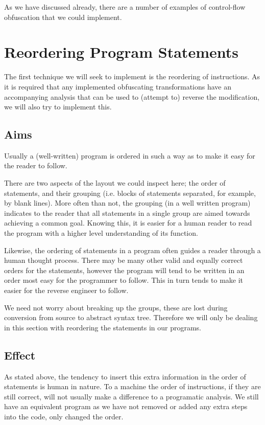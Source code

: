 \documentclass{report}
\begin{document}
As we have discussed already, there are a number of examples of control-flow obfuscation that we could implement.

\section{Reordering Program Statements}

The first technique we will seek to implement is the reordering of instructions. As it is required that
any implemented obfuscating transformations have an accompanying analysis that can be used to (attempt to)
reverse the modification, we will also try to implement this.

\subsection{Aims}

Usually a (well-written) program is ordered in such a way as to make it easy for the reader to follow.

There are two aspects of the layout we could inspect here; the order of statements, and their grouping (i.e. blocks of statements
separated, for example, by blank lines). More often than not, the grouping (in a well written program) indicates
to the reader that all statements in a single group are aimed towards achieving a common goal.
Knowing this, it is easier for a human reader to read the program with a higher level understanding
of its function.

Likewise, the ordering of statements in a program often guides a reader through a human thought process. There may
be many other valid and equally correct orders for the statements, however the program will tend to be written in
an order most easy for the programmer to follow. This in turn tends to make it easier for the reverse engineer to follow.

We need not worry about breaking up the groups, these are lost during conversion from source to abstract syntax tree.
Therefore we will only be dealing in this section with reordering the statements in our programs.

\subsection{Effect}

As stated above, the tendency to insert this extra information in the order of statements is human in nature. To a machine the
order of instructions, if they are still correct, will not usually make a difference to a programatic analysis. We still have an
equivalent program as we have not removed or added any extra steps into the code, only changed the order.
\end{document}

